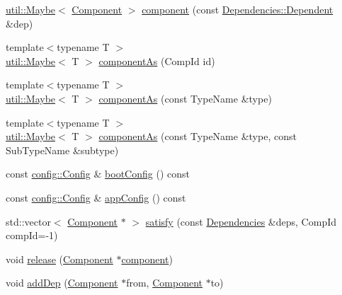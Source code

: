 \begin{DoxyCompactItemize}
\item 
\hyperlink{classtheoria_1_1util_1_1Maybe}{util\+::\+Maybe}$<$ \hyperlink{classtheoria_1_1core_1_1Component}{Component} $>$ \hyperlink{classtheoria_1_1core_1_1Registry_a535f463285f3232258573c4e8ae2d9f9}{component} (const \hyperlink{structtheoria_1_1core_1_1Dependencies_1_1Dependent}{Dependencies\+::\+Dependent} \&dep)
\item 
{\footnotesize template$<$typename T $>$ }\\\hyperlink{classtheoria_1_1util_1_1Maybe}{util\+::\+Maybe}$<$ T $>$ \hyperlink{classtheoria_1_1core_1_1Registry_aea2d62c83c04fddd8959bed80c556ca3}{component\+As} (Comp\+Id id)
\item 
{\footnotesize template$<$typename T $>$ }\\\hyperlink{classtheoria_1_1util_1_1Maybe}{util\+::\+Maybe}$<$ T $>$ \hyperlink{classtheoria_1_1core_1_1Registry_a90b05bb2e88d6bed56173d74e4e96802}{component\+As} (const Type\+Name \&type)
\item 
{\footnotesize template$<$typename T $>$ }\\\hyperlink{classtheoria_1_1util_1_1Maybe}{util\+::\+Maybe}$<$ T $>$ \hyperlink{classtheoria_1_1core_1_1Registry_a4140c9c7405974759ee43eb07a05a087}{component\+As} (const Type\+Name \&type, const Sub\+Type\+Name \&subtype)
\item 
const \hyperlink{classtheoria_1_1config_1_1Config}{config\+::\+Config} \& \hyperlink{classtheoria_1_1core_1_1Registry_ac998e5555375fc21fd7ad6aa3b0a87da}{boot\+Config} () const
\item 
const \hyperlink{classtheoria_1_1config_1_1Config}{config\+::\+Config} \& \hyperlink{classtheoria_1_1core_1_1Registry_a9d1514b8e21145742c0a850e00a90bf9}{app\+Config} () const
\item 
std\+::vector$<$ \hyperlink{classtheoria_1_1core_1_1Component}{Component} $\ast$ $>$ \hyperlink{classtheoria_1_1core_1_1Registry_aaa8dbdd7993478eea310fa111e36d40a}{satisfy} (const \hyperlink{classtheoria_1_1core_1_1Dependencies}{Dependencies} \&deps, Comp\+Id comp\+Id=-\/1)
\item 
void \hyperlink{classtheoria_1_1core_1_1Registry_adead32a72f8f70bac8f01645dc912720}{release} (\hyperlink{classtheoria_1_1core_1_1Component}{Component} $\ast$\hyperlink{classtheoria_1_1core_1_1Registry_a33f5edc42d5a194a7682bf0bf20cbf52}{component})
\item 
void \hyperlink{classtheoria_1_1core_1_1Registry_ad5ada88f383f823f983810b70f80d67b}{add\+Dep} (\hyperlink{classtheoria_1_1core_1_1Component}{Component} $\ast$from, \hyperlink{classtheoria_1_1core_1_1Component}{Component} $\ast$to)
\end{DoxyCompactItemize}
